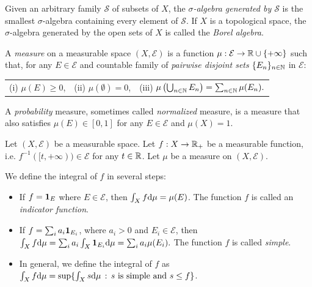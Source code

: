 Given an arbitrary family $\mathcal S$ of subsets of $X$, the {\em $\sigma$-algebra generated by $\mathcal S$} is the smallest
$\sigma$-algebra containing every element of $\mathcal S$. If $X$ is a topological space, the $\sigma$-algebra generated by
the open sets of $X$ is called the {\em Borel algebra}.

\begin{defin}
A {\em measure} on a measurable space $(X,\mathcal E)$ is a function $\mu:\mathcal E\rightarrow\mathbb{R}\cup\{+\infty\}$ such that,
for any $E\in\mathcal E$ and countable family of {\em pairwise disjoint sets} $\{E_n\}_{n\in\mathbb{N}}$ in $\mathcal E$:

\begin{tabular}{lll}\vspace{-0.5cm} 
{\rm (i)} $\mu(E)\geq 0$, &
{\rm (ii)} $\mu(\emptyset)=0$, &
{\rm (iii)} $\mu\left(\bigcup_{n\in\mathbb{N}}E_n\right)=\sum_{n\in\mathbb{N}}\mu(E_n).$
\end{tabular}\vspace{0.5cm} 

A {\em probability} measure, sometimes called {\em normalized} measure, 
is a measure that also satisfies $\mu(E)\in[0,1]$ for any $E\in\mathcal E$ and $\mu(X)=1$.
\end{defin}

\begin{defin}
Let $(X,\mathcal E)$ be a measurable space.
Let $f:X\rightarrow\mathbb{R}_+$ be a measurable function, i.e. $f^{-1}([t,+\infty))\in\mathcal E$ for any $t\in\mathbb{R}$.
Let $\mu$ be a measure on $(X,\mathcal E)$. 

We define the integral of $f$ in several steps:
\begin{itemize}
\item If $f={\bf 1}_E$ where $E\in\mathcal E$, then $\int_X f{\rm d}\mu = \mu(E)$.
The function $f$ is called an {\em indicator function}.
\item If $f=\sum_i a_i {\bf 1}_{E_i}$, where $a_i>0$ and $E_i\in\mathcal{E}$, then 
$\int_X f{\rm d}\mu = \sum_i a_i\int_X{\bf 1}_{E_i}{\rm d}\mu = \sum_ia_i\mu(E_i).$
The function $f$ is called {\em simple}.
\item %
In general, we define the integral of $f$ as $\int_X f{\rm d}\mu = \sup\{\int_X s{\rm d}\mu\,:\, s\text{ is simple and }s\leq f\}$.
\end{itemize}
\end{defin}

